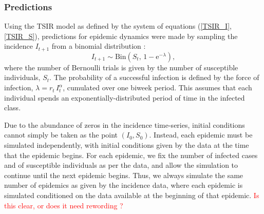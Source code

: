 \documentclass[10pt]{article}
\begin{document}
\subsubsection*{Predictions}

Using the TSIR model as defined by the system of equations (\ref{TSIR_I}, \ref{TSIR_S}), predictions for epidemic dynamics were made by sampling the incidence $I_{t+1}$ from a binomial distribution :
\begin{equation}
I_{t+1} \sim \mathrm{Bin}\left(S_t, \, 1-\mathrm{e}^{-\lambda}\right),
\end{equation}
where the number of Bernoulli trials is given by the number of susceptible individuals, $S_t$. The probability of a successful infection is defined by the force of infection, $\lambda = r_t\,I_t^\alpha$, cumulated over one biweek period. This assumes that each individual spends an exponentially-distributed period of time in the infected class.

Due to the abundance of zeros in the incidence time-series, initial conditions cannot simply be taken as the point $\left(I_0, S_0\right)$. Instead, each epidemic must be simulated independently, with initial conditions given by the data at the time that the epidemic begins. For each epidemic, we fix the number of infected cases and of susceptible individuals as per the data, and allow the simulation to continue until the next epidemic begins. Thus, we always simulate the same number of epidemics as given by the incidence data, where each epidemic is simulated conditioned on the data available at the beginning of that epidemic. \textcolor{red}{Is this clear, or does it need rewording ?}
\end{document}
